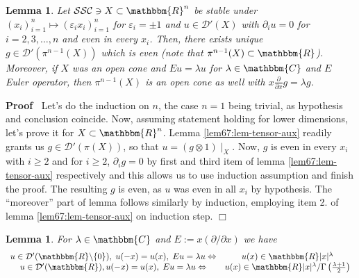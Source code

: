 \documentclass{article}
\newcommand{\assign}{:=}
\renewenvironment{proof}{\noindent\textbf{Proof\ }}{\hspace*{\fill}$\Box$\medskip}
\newtheorem{lemma}[proposition]{Lemma}
\theoremstyle{remark}
\begin{document}
\begin{lemma}
  \label{lem67:lem-tensor}Let $\mathcal{S}\mathcal{S}\mathcal{C} \ni X \subset
  \mathbbm{R}^n$ be stable under $(x_i)_{i = 1}^n \mapsto (\varepsilon_i
  x_i)_{i = 1}^n$ for $\varepsilon_i = \pm 1$ and $u \in \mathcal{D}' (X)$
  with $\partial_i u = 0$ for $i = 2, 3, \ldots, n$ and even in every $x_i$.
  Then, there exists unique $g \in \mathcal{D}' (\pi^{n - 1} (X))$ which is
  even (note that $\pi^{n - 1} (X) \subset \mathbbm{R}$). Moreover, if $X$ was
  an open cone and $E u = \lambda u$ for $\lambda \in \mathbbm{C}$ and $E$
  Euler operator, then $\pi^{n - 1} (X)$ is an open cone as well with $x
  \frac{\partial}{\partial x} g = \lambda g$.
\end{lemma}

\begin{proof}
  Let's do the induction on $n$, the case $n = 1$ being trivial, as hypothesis
  and conclusion coincide. Now, assuming statement holding for lower
  dimensions, let's prove it for $X \subset \mathbbm{R}^n$. Lemma
  \ref{lem67:lem-tensor-aux} readily grants us $g \in \mathcal{D}' (\pi (X))$,
  so that $u = (g \otimes 1) \mid_X$. Now, $g$ is even in every $x_i$ with
  $i \geqslant 2$ and for $i \geqslant 2$, $\partial_i g = 0$ by first and
  third item of lemma \ref{lem67:lem-tensor-aux} respectively and this allows
  us to use induction assumption and finish the proof. The resulting $g$ is
  even, as $u$ was even in all $x_i$ by hypothesis. The ``moreover'' part of
  lemma follows similarly by induction, employing item 2. of lemma
  \ref{lem67:lem-tensor-aux} on induction step.
\end{proof}

\begin{lemma}
  \label{lem67:lem-homogR}For $\lambda \in \mathbbm{C}$ and $E \assign x
  (\partial / \partial x)$ we have
  \[ \begin{array}{cc}
       \begin{array}{c}
         
       \end{array} u \in \mathcal{D}' (\mathbbm{R}\backslash \{ 0 \}), \; u (-
       x) = u (x), \; E u = \lambda u \Leftrightarrow & u (x) \in \mathbbm{R}
       | x |^{\lambda}\\
       u \in \mathcal{D}' (\mathbbm{R}), u (- x) = u (x), \; E u = \lambda u
       \Leftrightarrow & u (x) \in \mathbbm{R} | x |^{\lambda} / \Gamma \left(
       \frac{\lambda + 1}{2} \right)
     \end{array} \]
\end{lemma}
\end{document}
